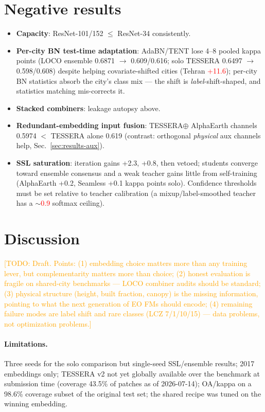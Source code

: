 \documentclass[11pt]{article}
\newif\ifverified
\newcommand{\uv}[1]{\ifverified#1\else\textcolor{red}{#1}\fi}
\newcommand{\todo}[1]{\textcolor{orange}{[TODO: #1]}}
\begin{document}
\section{Negative results}\label{sec:negatives}
\begin{itemize}
  \item \textbf{Capacity}: ResNet-101/152 $\leq$ ResNet-34
    consistently.
  \item \textbf{Per-city BN test-time adaptation}: AdaBN/TENT lose
    4--8 pooled kappa points (LOCO ensemble 0.6871 $\to$
    0.609/0.616; solo TESSERA 0.6497 $\to$ 0.598/0.608) despite
    helping covariate-shifted cities (Tehran \uv{+11.6}); per-city BN statistics absorb the
    city's class mix --- the shift is \emph{label}-shift-shaped, and
    statistics matching mis-corrects it.
  \item \textbf{Stacked combiners}: leakage autopsy above.
  \item \textbf{Redundant-embedding input fusion}: TESSERA$\oplus$
    AlphaEarth channels 0.5974 $<$ TESSERA alone 0.619
    (contrast: orthogonal \emph{physical} aux channels help,
    Sec.~\ref{sec:results-aux}).
  \item \textbf{SSL saturation}: iteration gains +2.3, +0.8,
    then vetoed; students converge toward ensemble consensus and a
    weak teacher gains little from self-training (AlphaEarth +0.2,
    Seamless +0.1 kappa points solo).
    Confidence thresholds must be set relative to teacher calibration
    (a mixup/label-smoothed teacher has a $\sim$\uv{0.9} softmax
    ceiling).
\end{itemize}

\section{Discussion}\label{sec:discussion}
\todo{Draft. Points: (1) embedding choice matters more than any
training lever, but complementarity matters more than choice; (2)
honest evaluation is fragile on shared-city benchmarks --- LOCO
combiner audits should be standard; (3) physical structure (height,
built fraction, canopy) is the missing information, pointing to what
the next generation of EO FMs should encode; (4) remaining failure
modes are label shift and rare classes (LCZ 7/1/10/15) --- data
problems, not optimization problems.}

\paragraph{Limitations.} Three seeds for the solo comparison but
single-seed SSL/ensemble results; 2017 embeddings only; TESSERA
v2 not yet globally available over the benchmark at submission time
(coverage 43.5\% of patches as of 2026-07-14); OA/kappa on a
98.6\% coverage subset of the original test set; the shared
recipe was tuned on the winning embedding.
\end{document}
